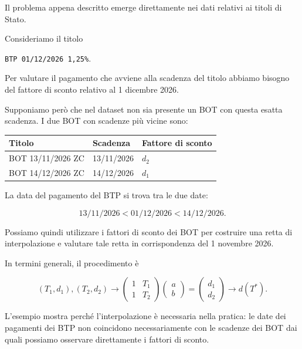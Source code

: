 Il problema appena descritto emerge direttamente nei dati relativi
ai titoli di Stato.

Consideriamo il titolo

\begin{center}
\texttt{BTP 01/12/2026 1,25\%}.
\end{center}

Per valutare il pagamento che avviene alla scadenza del titolo abbiamo
bisogno del fattore di sconto relativo al 1 dicembre 2026.

Supponiamo però che nel dataset non sia presente un BOT con questa
esatta scadenza. I due BOT con scadenze più vicine sono:

\begin{center}
\begin{tabular}{lll}
\hline
Titolo & Scadenza & Fattore di sconto\\
\hline
BOT 13/11/2026 ZC & 13/11/2026 & $d_2$\\
BOT 14/12/2026 ZC & 14/12/2026 & $d_1$\\
\hline
\end{tabular}
\end{center}

La data del pagamento del BTP si trova tra le due date:

\begin{equation*}
13/11/2026
<
01/12/2026
<
14/12/2026.
\end{equation*}

Possiamo quindi utilizzare i fattori di sconto dei BOT per
costruire una retta di interpolazione e valutare tale retta in
corrispondenza del 1 novembre 2026.

In termini generali, il procedimento è

\begin{equation*}
\boxed{
(T_1,d_1),(T_2,d_2)
\longrightarrow
\begin{pmatrix}
1&T_1\\
1&T_2
\end{pmatrix}
\begin{pmatrix}
a\\
b
\end{pmatrix}
=
\begin{pmatrix}
d_1\\
d_2
\end{pmatrix}
\longrightarrow
d(T^*)
}.
\end{equation*}

L'esempio mostra perché l'interpolazione è necessaria nella pratica:
le date dei pagamenti dei BTP non coincidono necessariamente con le
scadenze dei BOT dai quali possiamo osservare direttamente i fattori
di sconto.


